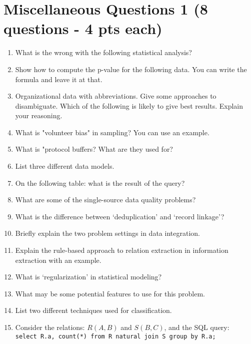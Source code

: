 \documentclass[11pt]{article}
\begin{document}
\section{Miscellaneous Questions 1 (8 questions - 4 pts each)}
\begin{enumerate}

\item What is the wrong with the following statistical analysis?

\item Show how to compute the p-value for the following data. You can write the formula and leave it at that.

\item Organizational data with abbreviations. Give some approaches to disambiguate. Which of the
following is likely to give best results. Explain your reasoning.

\item What is "volunteer bias" in sampling? You can use an example.

\item What is "protocol buffers? What are they used for?

\item List three different data models.

\item On the following table: what is the result of the query?

\item What are some of the single-source data quality problems?

\item What is the difference between `deduplication' and `record linkage'?

\item Briefly explain the two problem settings in data integration.

\item Explain the rule-based approach to relation extraction in information extraction with an
example.

\item What is `regularization' in statistical modeling?

\item What may be some potential features to use for this problem.

\item List two different techniques used for classification.

\item Consider the relations: $R(A, B)$ and $S(B, C)$, and the SQL query: \\[3pt] {\tt select R.a, count(*) from R natural join S group by R.a;}


\end{enumerate}
\end{document}
